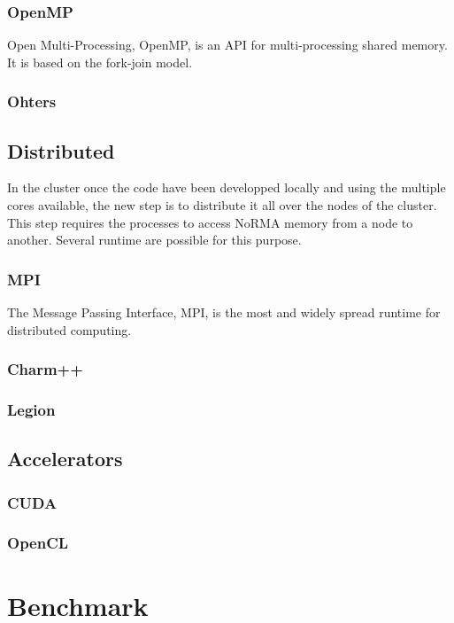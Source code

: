 \subsubsection{OpenMP}
Open Multi-Processing, OpenMP, is an API for multi-processing shared memory. 
It is based on the fork-join model.
\cite{chapman2008using,supinski2017scaling}

\subsubsection{Ohters}

\subsection{Distributed}
In the cluster once the code have been developped locally and using the multiple cores available, the new step is to distribute it all over the nodes of the cluster. 
This step requires the processes to access NoRMA memory from a node to another. 
Several runtime are possible for this purpose.

\subsubsection{MPI}
The Message Passing Interface, MPI, is the most and widely spread runtime for distributed computing.
\cite{gropp2014using,gropp2015using}

\subsubsection{Charm++}
\subsubsection{Legion}

\subsection{Accelerators}
\subsubsection{CUDA}
\subsubsection{OpenCL}

\section{Benchmark}

